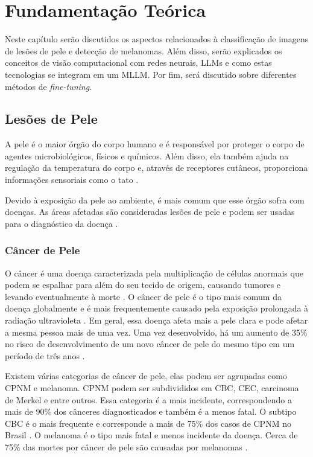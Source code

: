 \chapter{Fundamentação Teórica}

Neste capítulo serão discutidos os aspectos relacionados à classificação de imagens de lesões de pele e detecção de melanomas. Além disso, serão explicados os conceitos
de visão computacional com redes neurais, \ac{LLMs} e como estas tecnologias se integram em um \ac{MLLM}. Por fim, será discutido sobre diferentes métodos de
\textit{fine-tuning}.

\section{Lesões de Pele}

A pele é o maior órgão do corpo humano e é responsável por proteger o corpo de agentes microbiológicos, físicos e químicos. Além disso, ela também ajuda na regulação da
temperatura do corpo e, através de receptores cutâneos, proporciona informações sensoriais como o tato \cite{skin}.

Devido à exposição da pele ao ambiente, é mais comum que esse órgão sofra com doenças. As áreas afetadas são consideradas lesões de pele e podem ser usadas para o
diagnóstico da doença \cite{segmentation_skin_lesions}.

\subsection{Câncer de Pele}

O câncer é uma doença caracterizada pela multiplicação de células anormais que podem se espalhar para além do seu tecido de origem, causando tumores e levando
eventualmente à morte \cite{cancer}. O câncer de pele é o tipo mais comum da doença globalmente e é mais frequentemente causado pela exposição prolongada à radiação
ultravioleta \cite{skin_cancer}. Em geral, essa doença afeta mais a pele clara e pode afetar a mesma pessoa mais de uma vez. Uma vez desenvolvido, há um aumento de 35\%
no risco de desenvolvimento de um novo câncer de pele do mesmo tipo em um período de três anos \cite{skin_cancer_zink}.

Existem várias categorias de câncer de pele, elas podem ser agrupadas como \ac{CPNM} e melanoma. \ac{CPNM} podem ser subdivididos em \ac{CBC}, \ac{CEC}, carcinoma de
Merkel e entre outros. Essa categoria é a mais incidente, correspondendo a mais de 90\% dos cânceres diagnosticados e também é a menos fatal. O subtipo \ac{CBC} é o
mais frequente e corresponde a mais de 75\% dos casos de \ac{CPNM} no Brasil \cite{skin_cancer_zink}. O melanoma é o tipo mais fatal e menos incidente da doença. Cerca
de 75\% das mortes por câncer de pele são causadas por melanomas \cite{skin_cancer_screening}.

